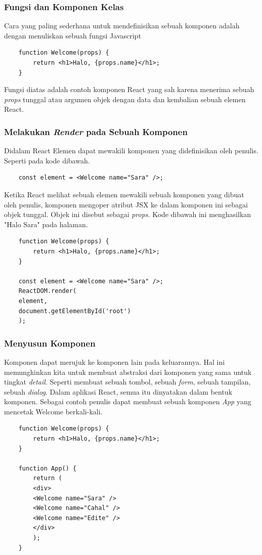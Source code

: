 \subsubsection{Fungsi dan Komponen Kelas}
Cara yang paling sederhana untuk mendefinisikan sebuah komponen adalah dengan menuliskan sebuah fungsi Javascript
\begin{lstlisting}
	function Welcome(props) {
		return <h1>Halo, {props.name}</h1>;
	}
\end{lstlisting}
Fungsi diatas adalah contoh komponen React yang sah karena menerima sebuah \textit{props} tunggal atau argumen objek dengan data dan kembalian sebuah elemen React. 

\subsubsection{Melakukan \textit{Render} pada Sebuah Komponen}
Didalam React Elemen dapat mewakili komponen yang didefinisikan oleh penulis. Seperti pada kode dibawah.
\begin{lstlisting}
	const element = <Welcome name="Sara" />;
\end{lstlisting}
Ketika React melihat sebuah elemen mewakili sebuah komponen yang dibuat oleh penulis, komponen mengoper atribut JSX ke dalam komponen ini sebagai objek tunggal. Objek ini disebut sebagai \textit{props}. Kode dibawah ini menghasilkan "Halo Sara" pada halaman.
\begin{lstlisting}
	function Welcome(props) {
		return <h1>Halo, {props.name}</h1>;
	}
	
	const element = <Welcome name="Sara" />;
	ReactDOM.render(
	element,
	document.getElementById('root')
	);
\end{lstlisting} 

\subsubsection{Menyusun Komponen}
Komponen dapat merujuk ke komponen lain pada keluarannya. Hal ini memungkinkan kita untuk membuat abstraksi dari komponen yang sama untuk tingkat \textit{detail}. Seperti membuat sebuah tombol, sebuah \textit{form}, sebuah tampilan, sebuah \textit{dialog}. Dalam aplikasi React, semua itu dinyatakan dalam bentuk komponen. Sebagai contoh penulis dapat membuat sebuah komponen \textit{App} yang mencetak Welcome berkali-kali.
\begin{lstlisting}
	function Welcome(props) {
		return <h1>Halo, {props.name}</h1>;
	}
	
	function App() {
		return (
		<div>
		<Welcome name="Sara" />
		<Welcome name="Cahal" />
		<Welcome name="Edite" />
		</div>
		);
	}
\end{lstlisting}

